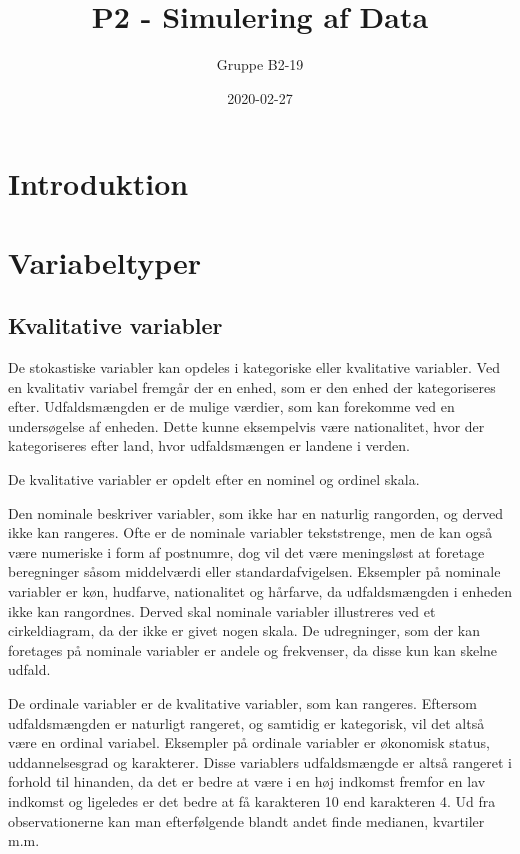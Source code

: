 \documentclass[]{book}
\title{P2 - Simulering af Data}
\author{Gruppe B2-19}
\date{2020-02-27}
\theoremstyle{definition}
\theoremstyle{definition}
\theoremstyle{definition}
\theoremstyle{remark}
\begin{document}
\maketitle

{
\setcounter{tocdepth}{1}
\tableofcontents
}
\hypertarget{introduktion}{%
\chapter{Introduktion}\label{introduktion}}

\hypertarget{variabeltyper}{%
\chapter{Variabeltyper}\label{variabeltyper}}

\hypertarget{kvalitative-variabler}{%
\section{Kvalitative variabler}\label{kvalitative-variabler}}

De stokastiske variabler kan opdeles i kategoriske eller kvalitative variabler. Ved en kvalitativ variabel fremgår der en enhed, som er den enhed der kategoriseres efter. Udfaldsmængden er de mulige værdier, som kan forekomme ved en undersøgelse af enheden. Dette kunne eksempelvis være nationalitet, hvor der kategoriseres efter land, hvor udfaldsmængen er landene i verden.

De kvalitative variabler er opdelt efter en nominel og ordinel skala.

Den nominale beskriver variabler, som ikke har en naturlig rangorden, og derved ikke kan rangeres. Ofte er de nominale variabler tekststrenge, men de kan også være numeriske i form af postnumre, dog vil det være meningsløst at foretage beregninger såsom middelværdi eller standardafvigelsen. Eksempler på nominale variabler er køn, hudfarve, nationalitet og hårfarve, da udfaldsmængden i enheden ikke kan rangordnes. Derved skal nominale variabler illustreres ved et cirkeldiagram, da der ikke er givet nogen skala. De udregninger, som der kan foretages på nominale variabler er andele og frekvenser, da disse kun kan skelne udfald.

De ordinale variabler er de kvalitative variabler, som kan rangeres. Eftersom udfaldsmængden er naturligt rangeret, og samtidig er kategorisk, vil det altså være en ordinal variabel. Eksempler på ordinale variabler er økonomisk status, uddannelsesgrad og karakterer. Disse variablers udfaldsmængde er altså rangeret i forhold til hinanden, da det er bedre at være i en høj indkomst fremfor en lav indkomst og ligeledes er det bedre at få karakteren 10 end karakteren 4. Ud fra observationerne kan man efterfølgende blandt andet finde medianen, kvartiler m.m.
\end{document}
